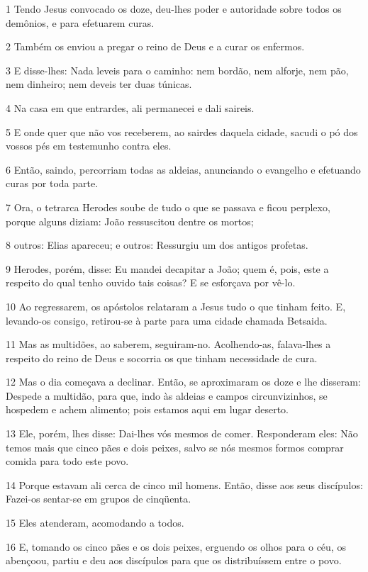 \par 1 Tendo Jesus convocado os doze, deu-lhes poder e autoridade sobre todos os demônios, e para efetuarem curas.
\par 2 Também os enviou a pregar o reino de Deus e a curar os enfermos.
\par 3 E disse-lhes: Nada leveis para o caminho: nem bordão, nem alforje, nem pão, nem dinheiro; nem deveis ter duas túnicas.
\par 4 Na casa em que entrardes, ali permanecei e dali saireis.
\par 5 E onde quer que não vos receberem, ao sairdes daquela cidade, sacudi o pó dos vossos pés em testemunho contra eles.
\par 6 Então, saindo, percorriam todas as aldeias, anunciando o evangelho e efetuando curas por toda parte.
\par 7 Ora, o tetrarca Herodes soube de tudo o que se passava e ficou perplexo, porque alguns diziam: João ressuscitou dentre os mortos;
\par 8 outros: Elias apareceu; e outros: Ressurgiu um dos antigos profetas.
\par 9 Herodes, porém, disse: Eu mandei decapitar a João; quem é, pois, este a respeito do qual tenho ouvido tais coisas? E se esforçava por vê-lo.
\par 10 Ao regressarem, os apóstolos relataram a Jesus tudo o que tinham feito. E, levando-os consigo, retirou-se à parte para uma cidade chamada Betsaida.
\par 11 Mas as multidões, ao saberem, seguiram-no. Acolhendo-as, falava-lhes a respeito do reino de Deus e socorria os que tinham necessidade de cura.
\par 12 Mas o dia começava a declinar. Então, se aproximaram os doze e lhe disseram: Despede a multidão, para que, indo às aldeias e campos circunvizinhos, se hospedem e achem alimento; pois estamos aqui em lugar deserto.
\par 13 Ele, porém, lhes disse: Dai-lhes vós mesmos de comer. Responderam eles: Não temos mais que cinco pães e dois peixes, salvo se nós mesmos formos comprar comida para todo este povo.
\par 14 Porque estavam ali cerca de cinco mil homens. Então, disse aos seus discípulos: Fazei-os sentar-se em grupos de cinqüenta.
\par 15 Eles atenderam, acomodando a todos.
\par 16 E, tomando os cinco pães e os dois peixes, erguendo os olhos para o céu, os abençoou, partiu e deu aos discípulos para que os distribuíssem entre o povo.
